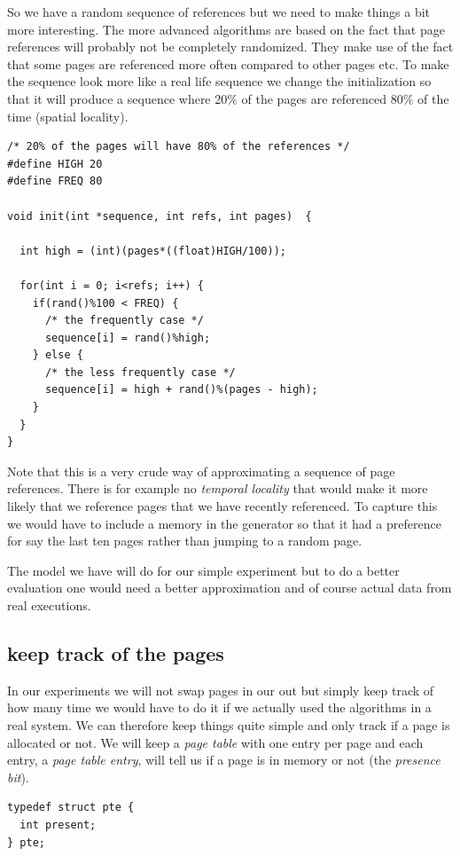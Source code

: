 \documentclass[a4paper,11pt]{article}
\begin{document}
So we have a random sequence of references but we need to make things
a bit more interesting. The more advanced algorithms are based on the
fact that page references will probably not be completely
randomized. They make use of the fact that some pages are referenced
more often compared to other pages etc. To make the sequence look more
like a real life sequence we change the initialization so that it will
produce a sequence where 20\% of the pages are referenced 80\% of the
time (spatial locality). 


\begin{lstlisting}
/* 20% of the pages will have 80% of the references */  
#define HIGH 20
#define FREQ 80

void init(int *sequence, int refs, int pages)  {

  int high = (int)(pages*((float)HIGH/100));

  for(int i = 0; i<refs; i++) {
    if(rand()%100 < FREQ) {
      /* the frequently case */
      sequence[i] = rand()%high;        
    } else {
      /* the less frequently case */
      sequence[i] = high + rand()%(pages - high);
    }
  }
}
\end{lstlisting}

Note that this is a very crude way of approximating a sequence of page
references. There is for example no {\em temporal locality} that would
make it more likely that we reference pages that we have recently
referenced. To capture this we would have to include a memory in the
generator so that it had a preference for say the last ten pages
rather than jumping to a random page. 

The model we have will do for our simple experiment but to do a better
evaluation one would need a better approximation and of course actual
data from real executions. 

\subsection{keep track of the pages}

In our experiments we will not swap pages in our out but simply keep
track of how many time we would have to do it if we actually used the
algorithms in a real system. We can therefore keep things quite simple
and only track if a page is allocated or not. We will keep a {\em page
  table} with one entry per page and each entry, a {\em page table
  entry}, will tell us if a page is in memory or not (the {\em
  presence bit}).

\begin{lstlisting}
typedef struct pte {
  int present;
} pte;
\end{lstlisting}
\end{document}
